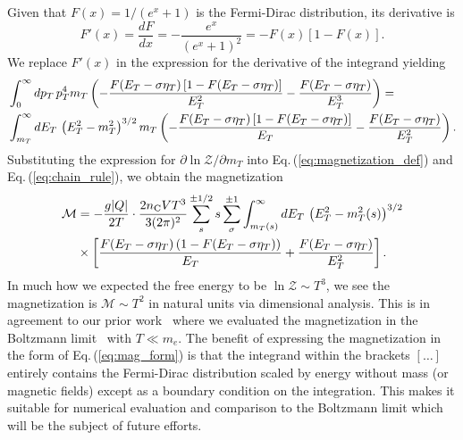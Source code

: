 \documentclass[epjST]{svjour}
\newcommand{\req}[1]{Eq.\,(\ref{#1})}
\begin{document}
Given that \( F(x) = 1/(e^{x} + 1) \) is the Fermi-Dirac distribution, its derivative is
\begin{equation}
F'(x) = \frac{dF}{dx} = -\frac{e^{x}}{(e^{x} + 1)^2} = -F(x)\left[1 - F(x)\right].
\end{equation}
We replace \( F'(x) \) in the expression for the derivative of the integrand yielding
\begin{align}
\notag
&\int_{0}^{\infty} dp_{T} \, p_{T}^{4} m_{T} \left( -\frac{F(E_{T} - \sigma\eta_{T})\left[1 - F(E_{T} - \sigma\eta_{T})\right]}{E_{T}^{2}} - \frac{F(E_{T} - \sigma\eta_{T})}{E_{T}^{3}} \right) =\\*
&\int_{m_{T}}^{\infty} dE_{T} \, \left(E_{T}^{2} - m_{T}^{2}\right)^{3/2} m_{T} \left( -\frac{F(E_{T} - \sigma\eta_{T})\left[1 - F(E_{T} - \sigma\eta_{T})\right]}{E_{T}} - \frac{F(E_{T} - \sigma\eta_{T})}{E_{T}^{2}} \right).
\end{align}
Substituting the expression for \(\partial \ln \mathcal{Z}/\partial m_{T}\) into \req{eq:magnetization_def} and \req{eq:chain_rule}, we obtain the magnetization
\begin{align}
\notag
\mathcal{M} &= -\frac{g|Q|}{2 T}\cdot\frac{2 n_\mathrm{C} V T^{3}}{3 (2\pi)^{2}} \sum_{s}^{\pm1/2} s \sum_{\sigma}^{\pm1} \int_{m_{T}(s)}^{\infty} dE_{T} \, \left(E_{T}^{2} - m_{T}^{2}(s)\right)^{3/2} \\
\label{eq:mag_form}
&\times
\left[ \frac{F(E_{T} - \sigma\eta_{T})\left(1 - F(E_{T} - \sigma\eta_{T})\right)}{E_{T}} + \frac{F(E_{T} - \sigma\eta_{T})}{E_{T}^{2}} \right].
\end{align}
In much how we expected the free energy to be \(\ln\mathcal{Z}\sim T^{3}\), we see the magnetization is \(\mathcal{M}\sim T^{2}\) in natural units via dimensional analysis. This is in agreement to our prior work~\cite{Steinmetz:2023nsc,Steinmetz:2023ucp} where we evaluated the magnetization in the Boltzmann limit~\cite{Steinmetz:2023nsc} with \(T\ll m_e\). The benefit of expressing the magnetization in the form of \req{eq:mag_form} is that the integrand within the brackets \([\ldots]\) entirely contains the Fermi-Dirac distribution scaled by energy without mass (or magnetic fields) except as a boundary condition on the integration. This makes it suitable for numerical evaluation and comparison to the Boltzmann limit which will be the subject of future efforts.

\end{document}
